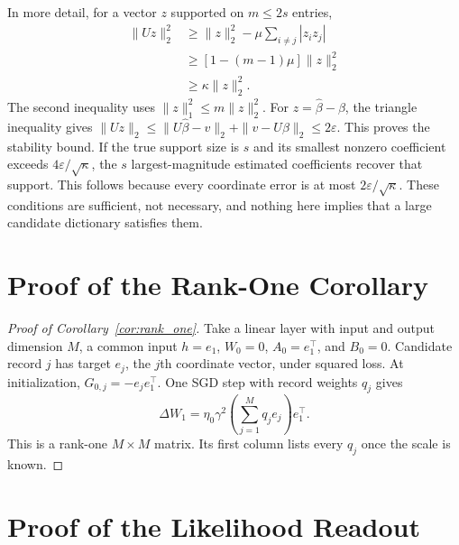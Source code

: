 \documentclass[11pt]{article}
\theoremstyle{plain}
\theoremstyle{definition}
\begin{document}
In more detail, for a vector $z$ supported on $m\leq2s$ entries,
\begin{align*}
\|Uz\|_2^2
&\geq \|z\|_2^2-\mu\sum_{i\ne j}|z_i z_j|\\
&\geq [1-(m-1)\mu]\|z\|_2^2\\
&\geq \kappa\|z\|_2^2.
\end{align*}
The second inequality uses $\|z\|_1^2\leq m\|z\|_2^2$.
For $z=\widehat\beta-\beta$, the triangle inequality gives
$\|Uz\|_2\leq\|U\widehat\beta-v\|_2+\|v-U\beta\|_2\leq2\varepsilon$.
This proves the stability bound.
If the true support size is $s$ and its smallest nonzero coefficient exceeds $4\varepsilon/\sqrt\kappa$, the $s$ largest-magnitude estimated coefficients recover that support.
This follows because every coordinate error is at most $2\varepsilon/\sqrt\kappa$.
These conditions are sufficient, not necessary, and nothing here implies that a large candidate dictionary satisfies them.

\section{Proof of the Rank-One Corollary}
\label{app:rank_one_proof}

\begin{proof}[Proof of Corollary~\ref{cor:rank_one}]
Take a linear layer with input and output dimension $M$, a common input $h=e_1$, $W_0=0$, $A_0=e_1^\top$, and $B_0=0$.
Candidate record $j$ has target $e_j$, the $j$th coordinate vector, under squared loss.
At initialization, $G_{0,j}=-e_je_1^\top$.
One SGD step with record weights $q_j$ gives
\begin{equation}
\Delta W_1=\eta_0\gamma^2\left(\sum_{j=1}^M q_j e_j\right)e_1^\top.
\label{eq:rank_one_construction}
\end{equation}
This is a rank-one $M\times M$ matrix. Its first column lists every $q_j$ once the scale is known.
\end{proof}

\section{Proof of the Likelihood Readout}
\label{app:readout_proof}
\end{document}
